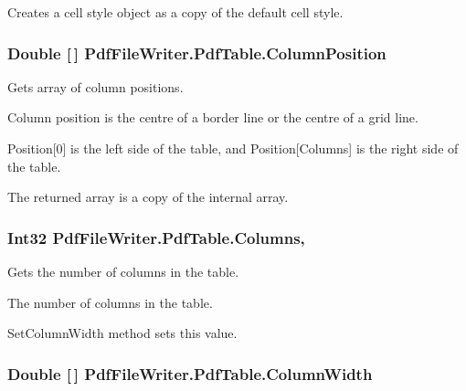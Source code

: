 Creates a cell style object as a copy of the default cell style. 

\subsubsection[{\texorpdfstring{Column\+Position}{ColumnPosition}}]{\setlength{\rightskip}{0pt plus 5cm}Double \mbox{[}$\,$\mbox{]} Pdf\+File\+Writer.\+Pdf\+Table.\+Column\+Position\hspace{0.3cm}{\ttfamily [get]}}\hypertarget{class_pdf_file_writer_1_1_pdf_table_ae3267d7559402fed44317f653ce1a0a1}{}\label{class_pdf_file_writer_1_1_pdf_table_ae3267d7559402fed44317f653ce1a0a1}


Gets array of column positions. 

Column position is the centre of a border line or the centre of a grid line. 

Position\mbox{[}0\mbox{]} is the left side of the table, and Position\mbox{[}Columns\mbox{]} is the right side of the table. 

The returned array is a copy of the internal array. 
\subsubsection[{\texorpdfstring{Columns}{Columns}}]{\setlength{\rightskip}{0pt plus 5cm}Int32 Pdf\+File\+Writer.\+Pdf\+Table.\+Columns\hspace{0.3cm}{\ttfamily [get]}, {\ttfamily [set]}}\hypertarget{class_pdf_file_writer_1_1_pdf_table_a08f3f6df9d1128ef8dba1bba064c4b32}{}\label{class_pdf_file_writer_1_1_pdf_table_a08f3f6df9d1128ef8dba1bba064c4b32}


Gets the number of columns in the table. 

The number of columns in the table.

Set\+Column\+Width method sets this value.
\subsubsection[{\texorpdfstring{Column\+Width}{ColumnWidth}}]{\setlength{\rightskip}{0pt plus 5cm}Double \mbox{[}$\,$\mbox{]} Pdf\+File\+Writer.\+Pdf\+Table.\+Column\+Width\hspace{0.3cm}{\ttfamily [get]}}\hypertarget{class_pdf_file_writer_1_1_pdf_table_a7c925f9f99dcd41a93adfa92a4d312c5}{}\label{class_pdf_file_writer_1_1_pdf_table_a7c925f9f99dcd41a93adfa92a4d312c5}


